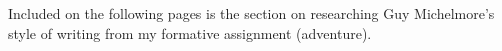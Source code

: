 

Included on the following pages is the section on researching Guy Michelmore's style of writing from my formative assignment (adventure).

